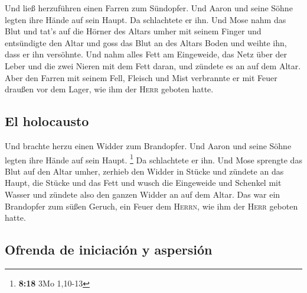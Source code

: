  Und ließ herzuführen einen Farren zum Sündopfer. Und
Aaron und seine Söhne legten ihre Hände auf sein Haupt. 
Da schlachtete er ihn. Und Mose nahm das Blut und tat's auf die Hörner
des Altars umher mit seinem Finger und entsündigte den Altar und goss
das Blut an des Altars Boden und weihte ihn, dass er ihn versöhnte.
 Und nahm alles Fett am Eingeweide, das Netz über der
Leber und die zwei Nieren mit dem Fett daran, und zündete es an auf dem
Altar.  Aber den Farren mit seinem Fell, Fleisch und Mist
verbrannte er mit Feuer draußen vor dem Lager, wie ihm der \textsc{Herr}
geboten hatte.

\hypertarget{el-holocausto}{%
\subsection{El holocausto}\label{el-holocausto}}

 Und brachte herzu einen Widder zum Brandopfer. Und Aaron
und seine Söhne legten ihre Hände auf sein Haupt. \footnote{\textbf{8:18}
  3Mo 1,10-13}  Da schlachtete er ihn. Und Mose sprengte
das Blut auf den Altar umher,  zerhieb den Widder in
Stücke und zündete an das Haupt, die Stücke und das Fett 
und wusch die Eingeweide und Schenkel mit Wasser und zündete also den
ganzen Widder an auf dem Altar. Das war ein Brandopfer zum süßen Geruch,
ein Feuer dem \textsc{Herrn}, wie ihm der \textsc{Herr} geboten hatte.

\hypertarget{ofrenda-de-iniciaciuxf3n-y-aspersiuxf3n}{%
\subsection{Ofrenda de iniciación y
aspersión}\label{ofrenda-de-iniciaciuxf3n-y-aspersiuxf3n}}

